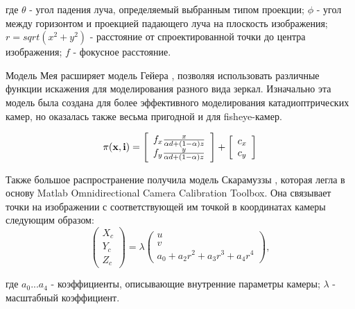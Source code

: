 \noindent где $\theta$ - угол падения луча, определяемый выбранным типом проекции; $\phi$ - угол между горизонтом 
и проекцией падающего луча на плоскость изображения; $r = sqrt(x^2+y^2)$ - расстояние от спроектированной точки до центра
изображения; $f$ - фокусное расстояние.

Модель Мея \cite{mei} расширяет модель Гейера \cite{geyer}, позволяя использовать различные функции искажения 
для моделирования разного вида зеркал. Изначально эта модель была создана для более эффективного моделирования 
катадиоптрических камер, но оказалась также весьма пригодной и для fisheye-камер. 

\begin{equation}
    \vspace{12pt}
\pi(\mathbf{x}, \mathbf{i})=\left[\begin{array}{l}
	f_{x} \frac{x}{\alpha d+(1-\alpha) z} \\
	f_{y} \frac{y}{\alpha d+(1-\alpha) z}
	\end{array}\right]+\left[\begin{array}{l}
	c_{x} \\
	c_{y}
	\end{array}\right]
    \vspace{12pt}
\end{equation}

Также большое распространение получила модель Скарамуззы \cite{scaramuzza}, которая легла в основу Matlab Omnidirectional 
Camera Calibration Toolbox. Она связывает точки на изображении с соответствующей им точкой в координатах камеры
следующим образом:
\vskip 12pt
\begin{equation}	
    \begin{pmatrix}X_c\\Y_c\\Z_c\end{pmatrix} = \lambda \begin{pmatrix}u\\v\\a_0 + a_2 r^2 + a_3 r^3 + a_4 r^4\end{pmatrix},
    \label{eqn:scaramuzza} 
\end{equation}
\vskip 24pt

\noindent где $a_0 ... a_4$ - коэффициенты, описывающие внутренние параметры камеры; $\lambda$ - масштабный коэффициент.


